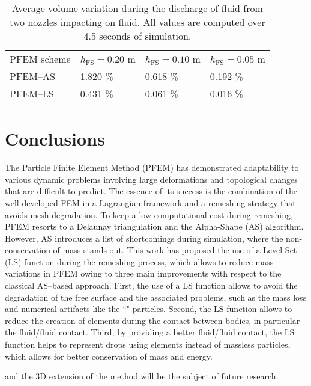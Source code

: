 \documentclass[final,3p,times]{elsarticle}
\newcommand{\EF}[1]{{\color{black}{#1}}}
\begin{document}
\begin{table}[t!] 
\captionsetup{width=.75\textwidth}
\caption{Average volume variation during the discharge of fluid from two nozzles impacting on fluid. All values are computed over 4.5 seconds of simulation.}\label{Tab:TN_dv}
\centering
  \begin{tabular}{l C{3cm} C{3cm} C{3cm}}
  \toprule
  	  PFEM scheme & 
  	  $h_\mathrm{FS} = 0.20$ m & 
  	  $h_\mathrm{FS} = 0.10$ m &
  	  $h_\mathrm{FS} = 0.05$ m 
  	  \\
  	  \cmidrule(rl){1-4} 
  	  PFEM--AS & 1.820 $\%$ & 0.618 $\%$ & 0.192 $\%$\\[1ex]
  	  PFEM--LS & 0.431 $\%$ & 0.061 $\%$ & 0.016 $\%$
	  \\
	  \bottomrule
  \end{tabular}
\end{table}


\section{Conclusions}\label{sec:Conclusions}

The Particle Finite Element Method (PFEM) has demonstrated adaptability to various dynamic problems involving large deformations and topological changes that are difficult to predict. The essence of its success is the combination of the well-developed FEM in a Lagrangian framework and a remeshing strategy that avoids mesh degradation. To keep a low computational cost during remeshing, PFEM resorts to a Delaunay triangulation and the Alpha-Shape (AS) algorithm. However, AS introduces a list of shortcomings during simulation, where the non-conservation of mass stands out. This work has proposed the use of a Level-Set (LS) function during the remeshing process, which allows to reduce mass variations in PFEM owing to three main improvements with respect to the classical AS--based approach. First, the use of a LS function allows to avoid the degradation of the free surface and the associated problems, such as the mass loss and numerical artifacts like the ``\EF{surfing}" particles. Second, the LS function allows to reduce the creation of elements during the contact between bodies, in particular the fluid/fluid contact. Third, by providing a better fluid/fluid contact, the LS function helps to represent drops using elements instead of massless particles, which allows for better conservation of mass and energy. 

\EF{Despite the significant improvements, the proposed LS-based remeshing approach does not reduce the mass variation in the no-slip flow of a fluid over a solid surface. This intrinsic issue of the PFEM formulation along with the accuracy of the LS function, computational performance,} and the 3D extension of the method will be the subject of future research. 
 
\end{document}
